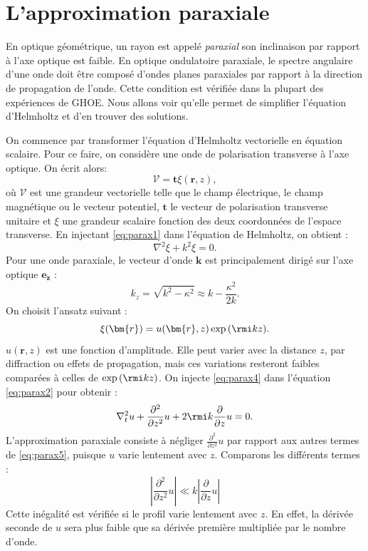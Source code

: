 \section{L'approximation paraxiale}
En optique géométrique, un rayon est appelé \textit{paraxial} son inclinaison par rapport à l'axe optique est faible. En optique ondulatoire paraxiale, le spectre angulaire d'une onde doit être composé d'ondes planes paraxiales par rapport à la direction de propagation de l'onde. Cette condition est vérifiée dans la plupart des expériences de GHOE. Nous allons voir qu'elle permet de simplifier l'équation d'Helmholtz et d'en trouver des solutions.\par
On commence par transformer l'équation d'Helmholtz vectorielle en équation scalaire. Pour ce faire, on considère une onde de polarisation transverse à l'axe optique. On écrit alors:
\begin{equation}
\bm{\mathcal{V}}=\bm{t}\xi(\bm{r},z),
\label{eq:parax1}
\end{equation}
où $\bm{\mathcal{V}}$ est une grandeur vectorielle telle que le champ électrique, le champ magnétique ou le vecteur potentiel, $\bm{t}$ le vecteur de polarisation transverse unitaire et $\xi$ une grandeur scalaire fonction des deux coordonnées de l'espace transverse. En injectant \ref{eq:parax1} dans l'équation de Helmholtz, on obtient :
\begin{equation}
\nabla^2{\xi}+k^2{\xi}=0.
\label{eq:parax2}
\end{equation}
Pour une onde paraxiale, le vecteur d'onde $\bm{k}$ est principalement dirigé sur l'axe optique $\bm{e_z}$ :
\begin{equation*}
k_z = \sqrt{k^2-\kappa^2}\approx k-\frac{\kappa^2}{2k}.
\label{eq:parax3}
\end{equation*}
On choisit l'ansatz suivant :
\begin{equation}
\xi(\bm{r})=u(\bm{r},z)\exp{(\rmi k z)}.
\label{eq:parax4}
\end{equation}
$u(\bm{r},z)$ est une fonction d'amplitude. Elle peut varier avec la distance $z$, par diffraction ou effets de propagation, mais ces variations resteront faibles comparées à celles de $\exp{(\rmi k z)}$. On injecte \ref{eq:parax4} dans l'équation \ref{eq:parax2} pour obtenir :
\begin{equation}
\nabla_t^2 u+\frac{\partial^2}{\partial z^2} u + 2\rmi k \frac{\partial}{\partial z} u =0.
\label{eq:parax5}
\end{equation}
L'approximation paraxiale consiste à négliger $\frac{\partial^2}{\partial z^2} u$ par rapport aux autres termes de \ref{eq:parax5}, puisque $u$ varie lentement avec $z$. Comparons les différents termes :
\begin{equation}
\left|\frac{\partial^2}{\partial z^2} u\right|\ll k\left| \frac{\partial}{\partial z} u\right|
\label{eq:para6}
\end{equation}
Cette inégalité est vérifiée si le profil varie lentement avec $z$. En effet, la dérivée seconde de $u$ sera plus faible que sa dérivée première multipliée par le nombre d'onde.

